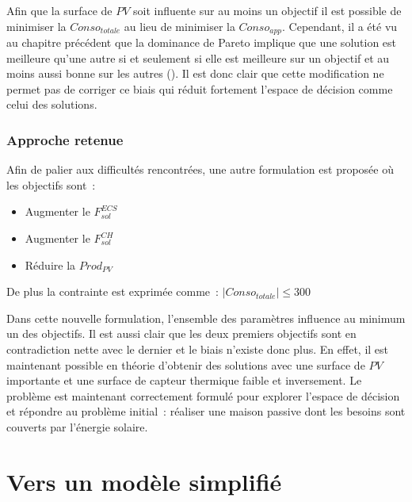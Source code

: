 Afin que la surface de $PV$ soit influente sur au moins un objectif il est possible
de minimiser la $Conso_{totale}$ au lieu de minimiser la $Conso_{app}$.
Cependant, il a été vu au chapitre précédent que la dominance de Pareto implique que une solution
est meilleure qu’une autre si et seulement si elle est meilleure sur un objectif et au moins
aussi bonne sur les autres (). Il est donc clair que
cette modification ne permet pas de corriger ce biais qui réduit fortement l’espace
de décision comme celui des solutions.


\subsubsection{Approche retenue} %
\label{ssub:approche_retenue}
Afin de palier aux difficultés rencontrées, une autre formulation est proposée où les objectifs
sont~:
\begin{itemize}
  \item Augmenter le $F_{sol}^{ECS}$
  \item Augmenter le $F_{sol}^{CH}$
  \item Réduire la $Prod_{PV}$
\end{itemize}
De plus la contrainte est exprimée comme~: $|Conso_{totale}| \leq 300$

Dans cette nouvelle formulation, l’ensemble des paramètres influence au minimum un des
objectifs. Il est aussi clair que les deux premiers objectifs sont en contradiction nette
avec le dernier et le biais n’existe donc plus. En effet, il est maintenant possible en
théorie d’obtenir des solutions avec une surface de $PV$ importante et une surface de
capteur thermique faible et inversement.
Le problème est maintenant correctement formulé pour explorer l’espace de décision et
répondre au problème initial~: réaliser une maison passive dont les besoins sont couverts
par l’énergie solaire.





\section{Vers un modèle simplifié} %
\label{sec:vers_un_modele_simplifie}
